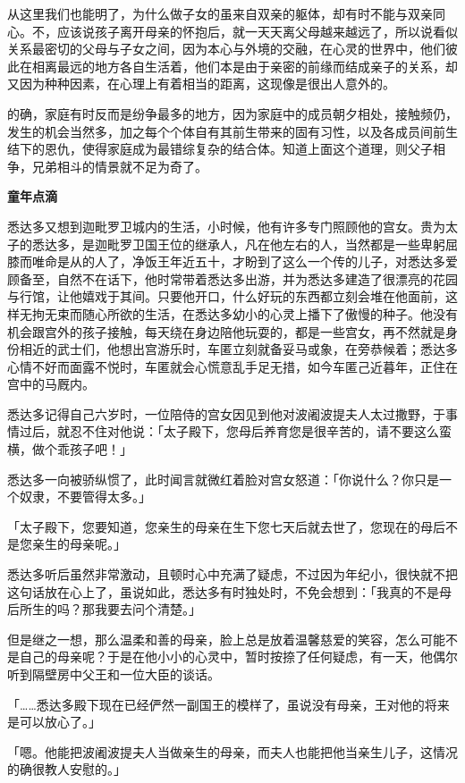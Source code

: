 \documentclass[twoside,openany]{book}
\newcommand{\mt}[1]{\textbullet \textbf{#1}}
\begin{document}
从这里我们也能明了，为什么做子女的虽来自双亲的躯体，却有时不能与双亲同心。不，应该说孩子离开母亲的怀抱后，就一天天离父母越来越远了，所以说看似关系最密切的父母与子女之间，因为本心与外境的交融，在心灵的世界中，他们彼此在相离最远的地方各自生活着，他们本是由于亲密的前缘而结成亲子的关系，却又因为种种因素，在心理上有着相当的距离，这现像是很出人意外的。

的确，家庭有时反而是纷争最多的地方，因为家庭中的成员朝夕相处，接触频仍，发生的机会当然多，加之每个个体自有其前生带来的固有习性，以及各成员间前生结下的恩仇，使得家庭成为最错综复杂的结合体。知道上面这个道理，则父子相争，兄弟相斗的情景就不足为奇了。

\mt{童年点滴}

悉达多又想到迦毗罗卫城内的生活，小时候，他有许多专门照顾他的宫女。贵为太子的悉达多，是迦毗罗卫国王位的继承人，凡在他左右的人，当然都是一些卑躬屈膝而唯命是从的人了，净饭王年近五十，才盼到了这么一个传的儿子，对悉达多爱顾备至，自然不在话下，他时常带着悉达多出游，并为悉达多建造了很漂亮的花园与行馆，让他嬉戏于其间。只要他开口，什么好玩的东西都立刻会堆在他面前，这样无拘无束而随心所欲的生活，在悉达多幼小的心灵上播下了傲慢的种子。他没有机会跟宫外的孩子接触，每天绕在身边陪他玩耍的，都是一些宫女，再不然就是身份相近的武士们，他想出宫游乐时，车匿立刻就备妥马或象，在旁恭候着；悉达多心情不好而面露不悦时，车匿就会心慌意乱手足无措，如今车匿己近暮年，正住在宫中的马厩内。

悉达多记得自己六岁时，一位陪侍的宫女因见到他对波阇波提夫人太过撒野，于事情过后，就忍不住对他说：「太子殿下，您母后养育您是很辛苦的，请不要这么蛮横，做个乖孩子吧！」

悉达多一向被骄纵惯了，此时闻言就微红着脸对宫女怒道：「你说什么？你只是一个奴隶，不要管得太多。」

「太子殿下，您要知道，您亲生的母亲在生下您七天后就去世了，您现在的母后不是您亲生的母亲呢。」

悉达多听后虽然非常激动，且顿时心中充满了疑虑，不过因为年纪小，很快就不把这句话放在心上了，虽说如此，悉达多有时独处时，不免会想到：「我真的不是母后所生的吗？那我要去问个清楚。」

但是继之一想，那么温柔和善的母亲，脸上总是放着温馨慈爱的笑容，怎么可能不是自己的母亲呢？于是在他小小的心灵中，暂时按捺了任何疑虑，有一天，他偶尔听到隔壁房中父王和一位大臣的谈话。

「……悉达多殿下现在已经俨然一副国王的模样了，虽说没有母亲，王对他的将来是可以放心了。」

「嗯。他能把波阇波提夫人当做亲生的母亲，而夫人也能把他当亲生儿子，这情况的确很教人安慰的。」
\end{document}
